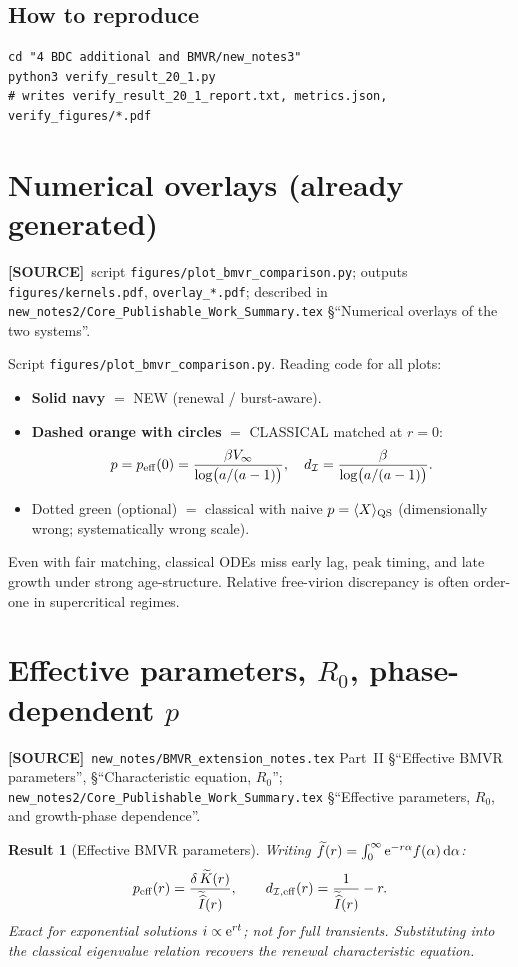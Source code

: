\documentclass[11pt,a4paper]{article}
\newcommand{\dd}{{\rm d}}
\newcommand{\ee}{{\rm e}}
\newcommand{\Ihat}{\widehat{I}}
\newcommand{\Icell}{\mathcal{I}}
\newcommand{\Lap}[1]{\widetilde{#1}}
\theoremstyle{plain}
\newtheorem{result}{Result}[section]
\theoremstyle{definition}
\theoremstyle{remark}
\newcommand{\SOURCE}{\textcolor{gray!50!black}{\textbf{[SOURCE]}}}
\begin{document}
\subsection{How to reproduce}
\begin{verbatim}
cd "4 BDC additional and BMVR/new_notes3"
python3 verify_result_20_1.py
# writes verify_result_20_1_report.txt, metrics.json, verify_figures/*.pdf
\end{verbatim}

\section{Numerical overlays (already generated)}
\label{sec:overlays}
\SOURCE\
script \texttt{figures/plot\_bmvr\_comparison.py};
outputs \texttt{figures/kernels.pdf}, \texttt{overlay\_*.pdf};
described in
\texttt{new\_notes2/Core\_Publishable\_Work\_Summary.tex}
\S``Numerical overlays of the two systems''.

Script \texttt{figures/plot\_bmvr\_comparison.py}. Reading code for all plots:
\begin{itemize}
\item \textbf{Solid navy} $=$ NEW (renewal / burst-aware).
\item \textbf{Dashed orange with circles} $=$ CLASSICAL matched at $r=0$:
  \[
  p=p_{\rm eff}(0)=\frac{\beta V_\infty}{\log\bigl(a/(a-1)\bigr)},
  \quad
  d_{\Icell}=\frac{\beta}{\log\bigl(a/(a-1)\bigr)}.
  \]
\item Dotted green (optional) $=$ classical with naive $p=\langle X\rangle_{\rm QS}$
  (dimensionally wrong; systematically wrong scale).
\end{itemize}
Even with fair matching, classical ODEs miss early lag, peak timing, and late
growth under strong age-structure. Relative free-virion discrepancy is often
order-one in supercritical regimes.

\section{Effective parameters, $R_0$, phase-dependent $p$}
\label{sec:peff}
\SOURCE\
\texttt{new\_notes/BMVR\_extension\_notes.tex}
Part~II \S``Effective BMVR parameters'',
\S``Characteristic equation, $R_0$'';
\texttt{new\_notes2/Core\_Publishable\_Work\_Summary.tex}
\S``Effective parameters, $R_0$, and growth-phase dependence''.

\begin{result}[Effective BMVR parameters]
Writing $\Lap{f}(r)=\int_0^\infty\ee^{-r\alpha}f(\alpha)\,\dd\alpha$:
\begin{equation}
p_{\rm eff}(r)=\frac{\delta\,\Lap{K}(r)}{\Lap{\Ihat}(r)},
\qquad
d_{\Icell,{\rm eff}}(r)=\frac{1}{\Lap{\Ihat}(r)}-r.
\end{equation}
Exact for exponential solutions $i\propto\ee^{rt}$; not for full transients.
Substituting into the classical eigenvalue relation recovers the renewal
characteristic equation.
\end{result}
\end{document}
